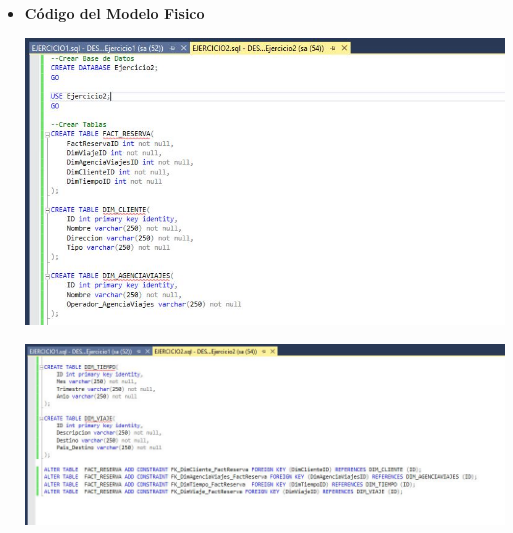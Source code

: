 \begin{itemize}
    \item \textbf{Código del Modelo Fisico}

	\begin{center}
	\includegraphics[width=17cm]{./Imagenes/Ejercicio2Fisico1}
	\end{center}	

	\begin{center}
	\includegraphics[width=17cm]{./Imagenes/Ejercicio2Fisico2}
	\end{center}	
\end{itemize}